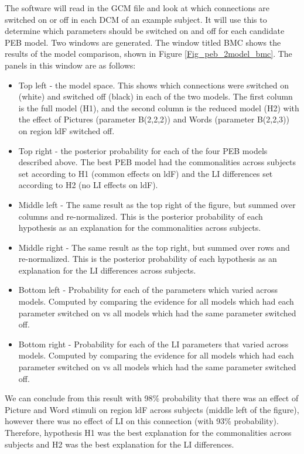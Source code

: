 \documentclass{article}
\begin{document}
The software will read in the GCM file and look at which connections are switched on or off in each DCM of an example subject. It will use this to determine which parameters should be switched on and off for each candidate PEB model. Two windows are generated. The window titled BMC shows the results of the model comparison, shown in Figure \ref{Fig_peb_2model_bmc}. The panels in this window are as follows:
\begin{itemize}
    \item Top left - the model space. This shows which connections were switched on (white) and switched off (black) in each of the two models. The first column is the full model (H1), and the second column is the reduced model (H2) with the effect of Pictures (parameter B(2,2,2)) and Words (parameter B(2,2,3)) on region ldF switched off.
    \item Top right - the posterior probability for each of the four PEB models described above. The best PEB model had the commonalities across subjects set according to H1 (common effects on ldF) and the LI differences set according to H2 (no LI effects on ldF).
    \item Middle left - The same result as the top right of the figure, but summed over columns and re-normalized. This is the posterior probability of each  hypothesis as an explanation for the commonalities across subjects.
    \item Middle right - The same result as the top right, but summed over rows and re-normalized. This is the posterior probability of each  hypothesis as an explanation for the LI differences across subjects.
    \item Bottom left - Probability for each of the parameters which varied across models. Computed by comparing the evidence for all models which had each parameter switched on vs all models which had the same parameter switched off.
    \item Bottom right - Probability for each of the LI parameters that varied across models. Computed by comparing the evidence for all models which had each parameter switched on vs all models which had the same parameter switched off.
\end{itemize}

We can conclude from this result with 98\% probability that there was an effect of Picture and Word stimuli on region ldF across subjects (middle left of the figure), however there was no effect of LI on this connection (with 93\% probability). Therefore, hypothesis H1 was the best explanation for the commonalities across subjects and H2 was the best explanation for the LI differences.
\end{document}
